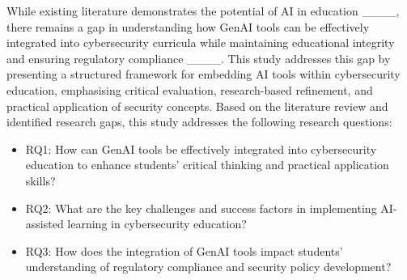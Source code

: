While existing literature demonstrates the potential of AI in education ____, there remains a gap in understanding how GenAI tools can be effectively integrated into cybersecurity curricula while maintaining educational integrity and ensuring regulatory compliance ____. This study addresses this gap by presenting a structured framework for embedding AI tools within cybersecurity education, emphasising critical evaluation, research-based refinement, and practical application of security concepts.
Based on the literature review and identified research gaps, this study addresses the following research questions:
\begin{itemize}
    \item RQ1: How can GenAI tools be effectively integrated into cybersecurity education to enhance students' critical thinking and practical application skills?
    \item RQ2: What are the key challenges and success factors in implementing AI-assisted learning in cybersecurity education?
    \item RQ3: How does the integration of GenAI tools impact students' understanding of regulatory compliance and security policy development?
\end{itemize}


